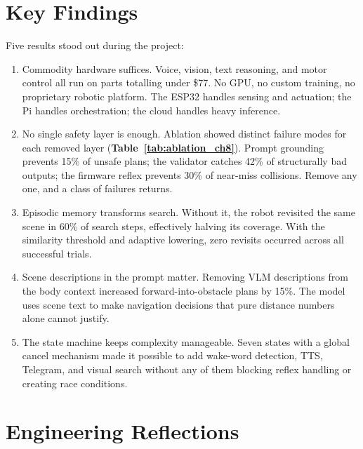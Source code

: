 \section{Key Findings}
\label{sec:key_findings}

Five results stood out during the project:

\begin{enumerate}[nosep]
  \item Commodity hardware suffices. Voice, vision, text reasoning, and motor control all run on parts totalling under \$77. No GPU, no custom training, no proprietary robotic platform. The ESP32 handles sensing and actuation; the Pi handles orchestration; the cloud handles heavy inference.

  \item No single safety layer is enough. Ablation showed distinct failure modes for each removed layer (\textbf{Table~\ref{tab:ablation_ch8}}). Prompt grounding prevents 15\% of unsafe plans; the validator catches 42\% of structurally bad outputs; the firmware reflex prevents 30\% of near-miss collisions. Remove any one, and a class of failures returns.

  \item Episodic memory transforms search. Without it, the robot revisited the same scene in 60\% of search steps, effectively halving its coverage. With the similarity threshold and adaptive lowering, zero revisits occurred across all successful trials.

  \item Scene descriptions in the prompt matter. Removing VLM descriptions from the body context increased forward-into-obstacle plans by 15\%. The model uses scene text to make navigation decisions that pure distance numbers alone cannot justify.

  \item The state machine keeps complexity manageable. Seven states with a global cancel mechanism made it possible to add wake-word detection, TTS, Telegram, and visual search without any of them blocking reflex handling or creating race conditions.
\end{enumerate}

\section{Engineering Reflections}
\label{sec:reflections}

